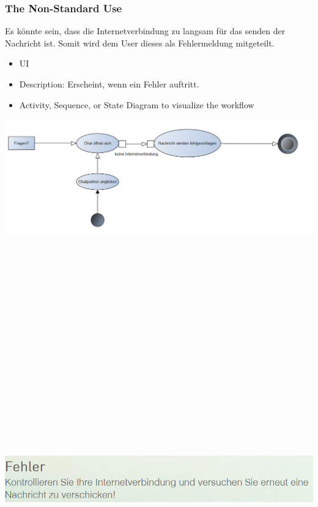 \documentclass[12pt]{article}
\theoremstyle{definition}
\begin{document}
\subsubsection{The Non-Standard Use}
Es könnte sein, dass die Internetverbindung zu langsam für das senden der Nachricht ist. Somit wird dem User dieses als Fehlermeldung mitgeteilt.
\begin{itemize}
	\item UI
	\item Description: Erscheint, wenn ein Fehler auftritt.
	\item Activity, Sequence, or State Diagram to visualize the workflow
\end{itemize}
\includegraphics[height=0.40\textwidth]{Chatten_Fehler.PNG}
\begin{center}\includegraphics[width=15cm,height=20cm,keepaspectratio]{Fehler2.PNG}\end{center}
\pagebreak
\end{document}
